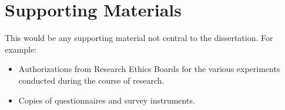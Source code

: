 \chapter{Supporting Materials}

This would be any supporting material not central to the dissertation.
For example:
\begin{itemize}
\item Authorizations from Research Ethics Boards for the various
    experiments conducted during the course of research.
\item Copies of questionnaires and survey instruments.
\end{itemize}
